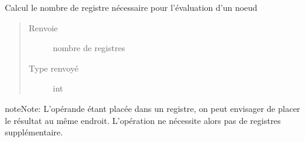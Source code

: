 \documentclass[letterpaper,10pt,french]{sphinxmanual}
\begin{document}
\begin{fulllineitems}
\begin{fulllineitems}
\begin{quote}
\begin{description}
\end{description}\end{quote}

\end{fulllineitems}


\begin{fulllineitems}
\label{\detokenize{arithmeticexpressionnodes:arithmeticexpressionnodes.InverseNode.getRegisterCost}}
Calcul le nombre de registre nécessaire pour l’évaluation d’un noeud
\begin{quote}\begin{description}
\item[{Renvoie}] \leavevmode
nombre de registres

\item[{Type renvoyé}] \leavevmode
int

\end{description}\end{quote}

\begin{sphinxadmonition}{note}{Note:}
L’opérande étant placée dans un registre, on peut envisager de placer le résultat au même endroit.
L’opération ne nécessite alors pas de registres supplémentaire.
\end{sphinxadmonition}

\end{fulllineitems}


\end{fulllineitems}

\end{document}
